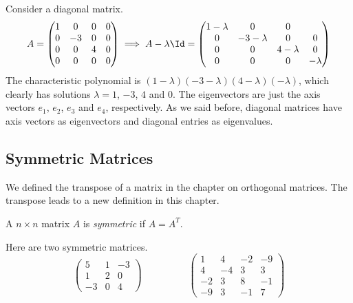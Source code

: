 \documentclass[fleqn]{report}
\begin{document}
\begin{example}
Consider a diagonal matrix.
\begin{equation*}
A = \left( \begin{matrix}
1 & 0 & 0 & 0 \\ 0 & -3 & 0 & 0 \\ 0 & 0 & 4 & 0 \\ 0 & 0 & 0
& 0 
\end{matrix} \right)
\implies A - \lambda \Id = 
\left( \begin{matrix}
1 - \lambda & 0 & 0 & \\ 0 & -3 - \lambda & 0 & 0 \\ 0 & 0 &
4 - \lambda & 0 \\ 0 & 0 & 0 & - \lambda
\end{matrix} \right)
\end{equation*}
The characteristic polynomial is
$(1-\lambda)(-3-\lambda)(4-\lambda)(-\lambda)$, which clearly
has solutions $\lambda = 1$, $-3$, $4$ and $0$. The
eigenvectors are just the axis vectors $e_1$, $e_2$, $e_3$ and
$e_4$, respectively. As we said before, diagonal matrices have
axis vectors as eigenvectors and diagonal entries as
eigenvalues. 
\end{example}

\subsection{Symmetric Matrices}
\label{symmetric-matrices}

We defined the transpose of a matrix in the chapter on
orthogonal matrices. The transpose leads to a new definition
in this chapter.

\begin{defn}
A $n \times n$ matrix $A$ is \emph{symmetric} if $A = A^T$.
\end{defn}

\begin{example}
Here are two symmetric matrices.
\begin{displaymath}
\left(
\begin{matrix}
5 & 1 & -3 \\
1 & 2 & 0 \\
-3 & 0 & 4 
\end{matrix}
\right)
\hspace{2cm}
\left(
\begin{matrix}
1 & 4 & -2 & -9 \\
4 & -4 & 3 & 3 \\
-2 & 3 & 8 & -1 \\
-9 & 3 & -1 & 7 
\end{matrix}
\right)
\end{displaymath}
\end{example}
\end{document}
